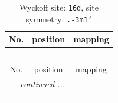 \documentclass[fleqn,8pt]{jsarticle}
\begin{document}
\renewcommand{\arraystretch}{1.2}
\begin{longtable}{ccc}
\caption{Wyckoff site: {\tt 16d}, site symmetry: {\tt .-3m1'}}
 \\
 \hline \hline
No. & position & mapping \\ \hline \endfirsthead

\multicolumn{2}{l}{\tablename\ \thetable{}} \\
 \hline \hline
No. & position & mapping \\ \hline \endhead

 \hline \hline
\multicolumn{2}{r}{\footnotesize\it continued ...} \\ \endfoot

 \hline \hline
\multicolumn{2}{r}{} \\ \endlastfoot


\end{longtable}
\end{document}
